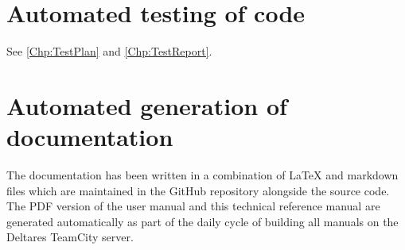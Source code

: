 \section{Automated testing of code}

See \autoref{Chp:TestPlan} and \autoref{Chp:TestReport}.

\section{Automated generation of documentation}

The documentation has been written in a combination of LaTeX and markdown files which are maintained in the GitHub repository alongside the source code.
The PDF version of the user manual and this technical reference manual are generated automatically as part of the daily cycle of building all manuals on the Deltares TeamCity server.
